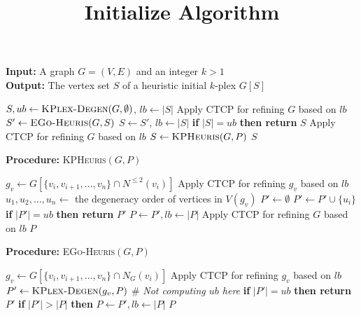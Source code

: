\documentclass[sigconf, nonacm]{acmart}
\begin{document}
\title{Initialize Algorithm}
\maketitle

\begin{algorithm}[t]
\caption{\textsc{Initialize}$(G,k)$}
\label{algo:find-init}

\begin{flushleft}
\textbf{Input:} A graph $G=(V,E)$ and an integer $k>1$\\
\textbf{Output:} The vertex set $S$ of a heuristic initial $k$-plex $G[S]$
\end{flushleft}

\begin{algorithmic}[1]
\State $S, ub \gets \textsc{KPlex-Degen}(G,\emptyset)$, $lb \gets |S|$
\State Apply CTCP for refining $G$ based on $lb$
\State $S' \gets \textsc{EGo-Heuris}(G,S)$
    \State $S \gets S'$, $lb \gets |S|$
    \State \textbf{if} $|S|=ub$ \textbf{then return} $S$
    \State Apply CTCP for refining $G$ based on $lb$
\EndIf
\State $S \gets \textsc{KPHeuris}(G,P)$
\State \Return $S$

\Statex
\Statex \textbf{Procedure:} \textsc{KPHeuris}$(G,P)$

    \State $g_v \gets G[\{v_i,v_{i+1},\ldots,v_n\}\cap N^{\leq 2}(v_i)]$
    \State Apply CTCP for refining $g_v$ based on $lb$
    \State $u_1,u_2,\ldots,u_n \gets$ the degeneracy order of vertices in $V(g_v)$
    \State $P' \gets \emptyset$
            \State $P' \gets P' \cup \{u_i\}$
            \State \textbf{if} $|P'|=ub$ \textbf{then return} $P'$
        \EndIf
    \EndFor
        \State $P \gets P', lb \gets |P|$
        \State Apply CTCP for refining $G$ based on $lb$
    \EndIf
\EndFor
\State \Return $P$

\Statex
\Statex \textbf{Procedure:} \textsc{EGo-Heuris}$(G,P)$

    \State $g_v \gets G[\{v_i, v_{i+1}, \ldots, v_n\} \cap N_G(v_i)]$
    \State Apply CTCP for refining $g_v$ based on $lb$
    \State $P' \gets \textsc{KPlex-Degen}(g_v, P)$ \hfill \# \textit{Not computing $ub$ here}
    \State \textbf{if} $|P'|=ub$ \textbf{then return} $P'$
    \State \textbf{if} $|P'| > |P|$ \textbf{then} $P \gets P', lb \gets |P|$
\EndFor
\State \Return $P$
\end{algorithmic}

\end{algorithm}
\end{document}
